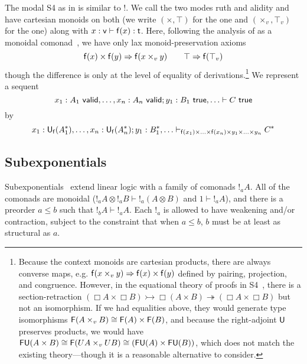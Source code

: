 The modal S4 \Bx{}{} as in \citet{pfenningdavies} is similar to !.  We
call the two modes ruth and alidity and have 
cartesian monoids on both (we write $(\times,\top)$ for the  one
and $(\times_v,\top_v)$ for the  one) along with $x : \mathsf{v}
\vdash \mathsf{f}(x) : \mathsf{t}$.  Here, following the analysis of \Bx{}{}
as a monoidal comonad~\citep{alechina+01categoricals4}, we have only lax
monoid-preservation axioms
\[
\mathsf{f}(x) \times \mathsf{f}(y) \Rightarrow \mathsf{f}(x \times_v y) \\
\qquad
\top \Rightarrow \mathsf{f}(\top_v)
\]
though the difference is only at the level of equality of
derivations.\footnote{Because the context monoids are cartesian
  products, there are always converse maps, e.g.  $\mathsf{f}(x \times_v y)
  \Rightarrow \mathsf{f}(x) \times \mathsf{f}(y)$ defined by pairing, projection, and
  congruence.  However, in the equational theory of proofs in
  S4~\citep{pfenningdavies}, there is a section-retraction $(\Box A
  \times \Box B) \rightarrowtail \Box (A \times B) \twoheadrightarrow
  (\Box A \times \Box B)$ but not an isomorphism. If we had equalities
  above, they would generate type isomorphisms $\mathsf{F}(A \times_v B)
  \cong \mathsf{F}(A) \times \mathsf{F}(B)$, and because the right-adjoint
  $\mathsf{U}$ preserves products, we would have $\mathsf{F} \mathsf{U} (A \times
  B) \cong \mathsf{F}(U A \times_v U B) \cong (\mathsf{FU}(A) \times
  \mathsf{FU}(B))$, which does not match the existing theory---though it is
  a reasonable alternative to consider.
}
We represent a sequent 
\[
 x_1:A_1 \,\, \mathsf{valid},\ldots,x_n:A_n \,\, \mathsf{valid};y_1:B_1 \,\, \mathsf{true},\ldots \vdash C \,\, \mathsf{true}
\]
by 
\[
x_1:\mathsf{U}_{\mathsf{f}}(A_1^*),\ldots,x_n:\mathsf{U}_{\mathsf{f}}(A_n^*);y_1:B_1^*,\ldots \vdash_{\mathsf{f}(x_1) \times\ldots\times \mathsf{f}(x_n) \times y_1 \times \ldots \times y_n} C^*
\]


\subsection{Subexponentials}

Subexponentials~\citep{danos+93subexponentials,nigammiller09subexponentials} extend linear logic with a family of
comonads $!_a A$.  All of the comonads are monoidal ($!_a A \otimes !_a
B \vdash !_a(A \otimes B)$ and $1 \vdash !_a A$), and there is a
preorder $a \le b$ such that $!_b A \vdash !_a A$.  Each $!_a$ is
allowed to have weakening and/or contraction, subject to the constraint
that when $a \le b$, $b$ must be at least as structural as $a$.

